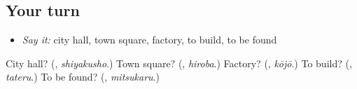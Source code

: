 \subsection*{Your turn}
\begin{itemize}
\raggedright
  \item \emph{Say it:} city hall, town square, factory, to build, to be found
\end{itemize}

\begin{tcolorbox}[breakable,colback=teal!4,colframe=teal!35!black,title={Before you move on}]
City hall? (\textbf{}, \emph{shiyakusho}.) Town square? (\textbf{}, \emph{hiroba}.) Factory? (\textbf{}, \emph{kōjō}.) To build? (\textbf{}, \emph{tateru}.) To be found? (\textbf{}, \emph{mitsukaru}.)
\end{tcolorbox}
